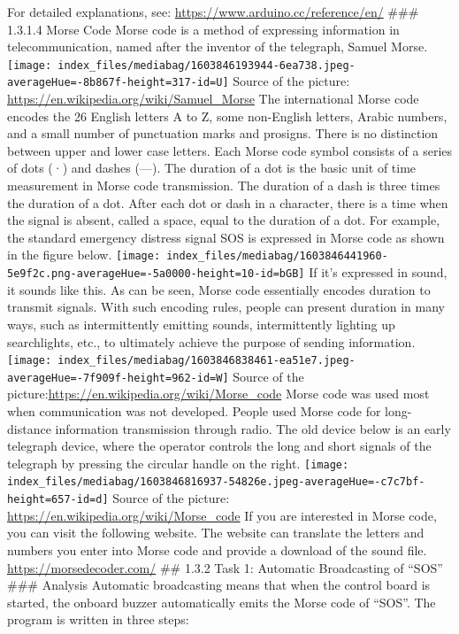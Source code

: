 \documentclass[
  letterpaper,
  DIV=11,
  numbers=noendperiod]{scrreprt}
\begin{document}
For detailed explanations, see:
\url{https://www.arduino.cc/reference/en/} \#\#\# 1.3.1.4 Morse Code
Morse code is a method of expressing information in telecommunication,
named after the inventor of the telegraph, Samuel Morse.
\texttt{[image: index\_files/mediabag/1603846193944-6ea738.jpeg-averageHue=-8b867f-height=317-id=U]}
Source of the picture: \url{https://en.wikipedia.org/wiki/Samuel_Morse}
The international Morse code encodes the 26 English letters A to Z, some
non-English letters, Arabic numbers, and a small number of punctuation
marks and prosigns. There is no distinction between upper and lower case
letters. Each Morse code symbol consists of a series of dots (·) and
dashes (---). The duration of a dot is the basic unit of time
measurement in Morse code transmission. The duration of a dash is three
times the duration of a dot. After each dot or dash in a character,
there is a time when the signal is absent, called a space, equal to the
duration of a dot. For example, the standard emergency distress signal
SOS is expressed in Morse code as shown in the figure below.
\texttt{[image: index\_files/mediabag/1603846441960-5e9f2c.png-averageHue=-5a0000-height=10-id=bGB]}
If it's expressed in sound, it sounds like this. As can be seen, Morse
code essentially encodes duration to transmit signals. With such
encoding rules, people can present duration in many ways, such as
intermittently emitting sounds, intermittently lighting up searchlights,
etc., to ultimately achieve the purpose of sending information.
\texttt{[image: index\_files/mediabag/1603846838461-ea51e7.jpeg-averageHue=-7f909f-height=962-id=W]}
Source of the picture:\url{https://en.wikipedia.org/wiki/Morse_code}
Morse code was used most when communication was not developed. People
used Morse code for long-distance information transmission through
radio. The old device below is an early telegraph device, where the
operator controls the long and short signals of the telegraph by
pressing the circular handle on the right.
\texttt{[image: index\_files/mediabag/1603846816937-54826e.jpeg-averageHue=-c7c7bf-height=657-id=d]}
Source of the picture: \url{https://en.wikipedia.org/wiki/Morse_code} If
you are interested in Morse code, you can visit the following website.
The website can translate the letters and numbers you enter into Morse
code and provide a download of the sound file.
\url{https://morsedecoder.com/} \#\# 1.3.2 Task 1: Automatic
Broadcasting of ``SOS'' \#\#\# Analysis Automatic broadcasting means
that when the control board is started, the onboard buzzer automatically
emits the Morse code of ``SOS''. The program is written in three steps:
\end{document}
